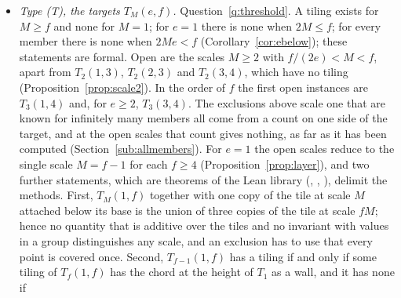 \documentclass[11pt,reqno]{amsart}
\theoremstyle{plain}
\theoremstyle{definition}
\begin{document}
\begin{itemize}
(); the ledger \cite{PaliyLedger} announces this row for every multiplier, and for $a<b$ Paliy's five-piece construction (a scale-$c$ triangle, three scale-$a$ triangles and a $(b-a)\times a$ parallelogram) is proved here for every tile, giving $(2a+b)(a+b)$ as a tile count whenever $0<a<b$ and $c^2=a^2+ab+b^2$ (); for $a<b$ the row F3 likewise, by Paliy's construction (the same layout with an added trapezoid), gives $3(a+b)(a+2b)$ as a tile count (); the remaining rows (F3 with $a>b$, reversed F4, F2) of the ledger were rebuilt in exact arithmetic from Paliy's descriptions and checked for every member up to $10^6$ (a computation, not formal), as was his tiling of $(49,91,120)$ by $312$ copies of $(3,5,7)$ (the F3 row; we re-found it by search and checked it in exact arithmetic, and the
construction and the priority are Paliy's) and his tiling of $(961,1426,1155)$ by $4830$ copies of $(24,11,31)$; while the
pairs of this type for $N=33$, $105$, $120$, $132$, $154$ and $184$ have no tiling, these $N$ not being tile
counts. A criterion is not known to us.
\item \emph{Type \textup{(T)}, the targets $T_M(e,f)$.} Question~\ref{q:threshold}. A tiling exists for
$M\ge f$ and none for $M=1$; for $e=1$ there is none when $2M\le f$; for every member there is none when
$2Me<f$ (Corollary~\ref{cor:ebelow}); these statements are formal. Open are the scales $M\ge2$ with
$f/(2e)<M<f$, apart from $T_2(1,3)$, $T_2(2,3)$ and $T_2(3,4)$, which have no tiling
(Proposition~\ref{prop:scale2}). In the
order of $f$ the first open instances are $T_3(1,4)$ and, for $e\ge2$, $T_3(3,4)$. The exclusions above scale
one that are known for infinitely many members all come from a count on one side of the target, and at the
open scales that count gives nothing, as far as it has been computed (Section~\ref{sub:allmembers}).
For $e=1$ the open scales reduce to the single scale $M=f-1$ for each $f\ge4$ (Proposition~\ref{prop:layer}), and
two further statements, which are theorems of the Lean library (,
, ), delimit the methods. First,
$T_M(1,f)$ together with one copy of the tile at scale $M$ attached below its base is the union of three copies of
the tile at scale $fM$; hence no quantity that is additive over the tiles and no invariant with values in a group
distinguishes any scale, and an exclusion has to use that every point is covered once. Second, $T_{f-1}(1,f)$ has a
tiling if and only if some tiling of $T_f(1,f)$ has the chord at the height of $T_1$ as a wall, and it has none if

\end{itemize}
\end{document}
